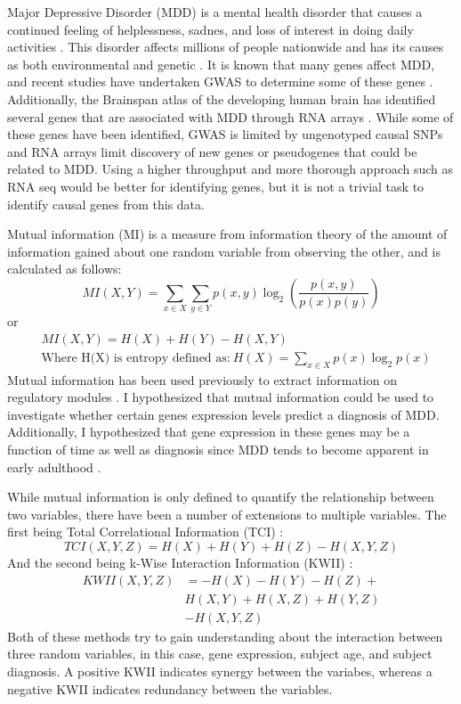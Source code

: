 \documentclass{bioinfo}
\begin{document}
Major Depressive Disorder (MDD) is a mental health disorder that causes a continued feeling of helplessness, sadnes, and loss of interest in doing daily activities \citep{Mayo}. This disorder affects millions of people nationwide and has its causes as both environmental and genetic \citep{Brainspan}.  It is known that many genes affect MDD, and recent studies have undertaken GWAS to determine some of these genes \citep{Cai, Malhotra}. Additionally, the Brainspan atlas of the developing
human brain has identified several genes that are associated with MDD through RNA arrays \citep{Brainspan}. While some of these genes have been identified, GWAS is limited by ungenotyped causal SNPs and RNA arrays limit discovery of new genes or pseudogenes that could be related to MDD.  Using a higher throughput and more thorough approach such as RNA seq would be better for identifying genes, but it is not a trivial task to identify causal genes from this data.

Mutual information (MI) is a measure from information theory of the amount of information gained about one random variable from observing the other, and is calculated as follows:
\begin{equation}
    MI(X,Y) = \sum_{x \in X} \sum_{y \in Y} p(x,y) \log_2 \left(\frac{p(x,y)}{p(x) p(y)}\right)
\end{equation}
or 
\begin{align}
    &MI(X,Y) = H(X) + H(Y) - H(X,Y) \\
    &\text{Where H(X) is entropy defined as:} \ H(X) = \sum_{x \in X} p(x) \log_2 p(x)
\end{align}
Mutual information has been used previously to extract information on regulatory modules \citep{Elemento}.  I hypothesized that mutual information could be used to investigate whether certain genes expression levels predict a diagnosis of MDD.  Additionally, I hypothesized that gene expression in these genes may be a function of time as well as diagnosis since MDD tends to become apparent in early adulthood \citep{Mayo}.  

While mutual information is only defined to quantify the relationship between two variables, there have been a number of extensions to multiple variables.  The first being Total Correlational Information (TCI) \citep{Timme, Watkinson}:
\begin{equation}
    TCI(X,Y,Z) = H(X) + H(Y) + H(Z) - H(X,Y,Z)
\end{equation}
And the second being k-Wise Interaction Information (KWII) \citep{Timme}:
\begin{equation}
    \begin{split}
        KWII(X,Y,Z) &= - H(X) - H(Y) - H(Z) + \\
                    &H(X,Y) + H(X,Z) + H(Y,Z) \\
                    &- H(X,Y,Z)
    \end{split}
\end{equation}
Both of these methods try to gain understanding about the interaction between three random variables, in this case, gene expression, subject age, and subject diagnosis.  A positive KWII indicates synergy between the variabes, whereas a negative KWII indicates redundancy between the variables.
\end{document}
